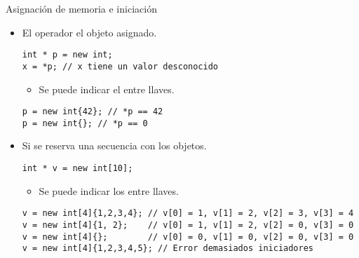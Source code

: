 \begin{frame}[t,fragile]{Asignación de memoria e iniciación}
\begin{itemize}
  \item El operador   el objeto asignado.
\begin{lstlisting}
int * p = new int;
x = *p; // x tiene un valor desconocido
\end{lstlisting}
    \begin{itemize}
      \item Se puede indicar el  entre llaves.
    \end{itemize}
\begin{lstlisting}
p = new int{42}; // *p == 42
p = new int{}; // *p == 0
\end{lstlisting}

  \item Si se reserva una secuencia con  
         los objetos.
\begin{lstlisting}
int * v = new int[10];
\end{lstlisting}
    \begin{itemize}
      \item Se puede indicar los  entre llaves.
    \end{itemize}
\begin{lstlisting}
v = new int[4]{1,2,3,4}; // v[0] = 1, v[1] = 2, v[2] = 3, v[3] = 4
v = new int[4]{1, 2};    // v[0] = 1, v[1] = 2, v[2] = 0, v[3] = 0
v = new int[4]{};        // v[0] = 0, v[1] = 0, v[2] = 0, v[3] = 0
v = new int[4]{1,2,3,4,5}; // Error demasiados iniciadores
\end{lstlisting}
\end{itemize}
\end{frame}

